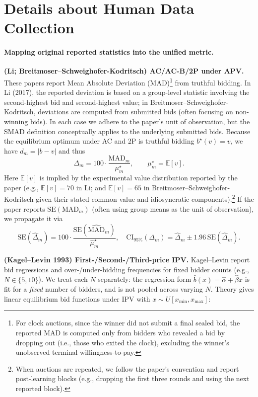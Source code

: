 \section{Details about Human Data Collection}


\paragraph{Mapping original reported statistics into the unified metric.}

\textbf{(Li; Breitmoser--Schweighofer-Kodritsch) AC/AC-B/2P under APV.}
These papers report Mean Absolute Deviation (MAD)\footnote{For clock auctions, since the winner did not submit a final sealed bid, the reported MAD is computed only from bidders who revealed a bid by dropping out (i.e., those who exited the clock), excluding the winner's unobserved terminal willingness-to-pay.}
 from truthful bidding. In Li (2017), the reported deviation is based on a group-level statistic involving the second-highest bid and second-highest value; in Breitmoser--Schweighofer-Kodritsch, deviations are computed from submitted bids (often focusing on non-winning bids). In each case we adhere to the paper's unit of observation, but the SMAD definition conceptually applies to the underlying submitted bids.
Because the equilibrium optimum under AC and 2P is truthful bidding $b^\star(v)=v$, we have $d_m=|b-v|$ and thus
\[
\Delta_m = 100\cdot \frac{\mathrm{MAD}_m}{\mu_m^\star},
\qquad
\mu_m^\star=\mathbb E[v].
\]
Here $\mathbb E[v]$ is implied by the experimental value distribution reported by the paper (e.g., $\mathbb E[v]=70$ in Li; and $\mathbb E[v]=65$ in Breitmoser--Schweighofer-Kodritsch given their stated common-value and idiosyncratic components).\footnote{When auctions are repeated, we follow the paper's convention and report post-learning blocks (e.g., dropping the first three rounds and using the next reported block).}
If the paper reports $\mathrm{SE}(\mathrm{MAD}_m)$ (often using group means as the unit of observation), we propagate it via
\[
\mathrm{SE}(\widehat{\Delta}_m)=100\cdot \frac{\mathrm{SE}(\widehat{\mathrm{MAD}}_m)}{\widehat{\mu}_m^\star},
\quad
\mathrm{CI}_{95\%}(\Delta_m)=\widehat{\Delta}_m \pm 1.96\,\mathrm{SE}(\widehat{\Delta}_m).
\]

\textbf{(Kagel--Levin 1993) First-/Second-/Third-price IPV.}
Kagel--Levin report bid regressions and over-/under-bidding frequencies for fixed bidder counts (e.g., $N\in\{5,10\}$). We treat each $N$ separately: the regression form $\hat b(x)=\hat\alpha+\hat\beta x$ is fit for a \emph{fixed} number of bidders, and is not pooled across varying $N$.
Theory gives linear equilibrium bid functions under IPV with $x\sim U[x_{\min},x_{\max}]$:

